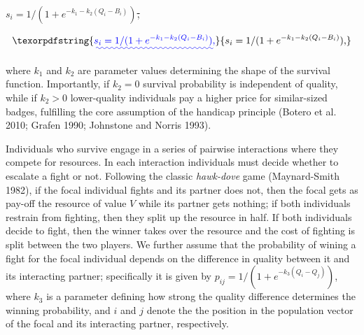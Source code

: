 \documentclass[
  12pt,
]{article}
\providecommand{\DIFaddtex}[1]{{\protect\color{blue}\uwave{#1}}} %
\providecommand{\DIFdeltex}[1]{{\protect\color{red}\sout{#1}}}                      %
\providecommand{\DIFaddbegin}{} %
\providecommand{\DIFaddend}{} %
\providecommand{\DIFdelbegin}{} %
\providecommand{\DIFdelend}{} %
\providecommand{\DIFadd}[1]{\texorpdfstring{\DIFaddtex{#1}}{#1}} %
\providecommand{\DIFdel}[1]{\texorpdfstring{\DIFdeltex{#1}}{}} %
\newcommand{\DIFscaledelfig}{0.5}
\newlength{\DIFdelgraphicswidth} %
\newlength{\DIFdelgraphicsheight} %
\newcommand{\DIFaddincludegraphics}[2][]{{\color{blue}\fbox{\DIFOincludegraphics[#1]{#2}}}} %
\newcommand{\DIFdelincludegraphics}[2][]{%
\sbox{\DIFdelgraphicsbox}{\DIFOincludegraphics[#1]{#2}}%
\settoboxwidth{\DIFdelgraphicswidth}{\DIFdelgraphicsbox} %
\settoboxtotalheight{\DIFdelgraphicsheight}{\DIFdelgraphicsbox} %
\scalebox{\DIFscaledelfig}{%
\parbox[b]{\DIFdelgraphicswidth}{\usebox{\DIFdelgraphicsbox}\\[-\baselineskip] \rule{\DIFdelgraphicswidth}{0em}}\llap{\resizebox{\DIFdelgraphicswidth}{\DIFdelgraphicsheight}{%
\setlength{\unitlength}{\DIFdelgraphicswidth}%
\begin{picture}(1,1)%
\thicklines\linethickness{2pt} %
{\color[rgb]{1,0,0}\put(0,0){\framebox(1,1){}}}%
{\color[rgb]{1,0,0}\put(0,0){\line( 1,1){1}}}%
{\color[rgb]{1,0,0}\put(0,1){\line(1,-1){1}}}%
\end{picture}%
}\hspace*{3pt}}} %
} %
\DeclareRobustCommand{\DIFaddbegin}{\DIFOaddbegin \let\includegraphics\DIFaddincludegraphics} %
\DeclareRobustCommand{\DIFaddend}{\DIFOaddend \let\includegraphics\DIFOincludegraphics} %
\DeclareRobustCommand{\DIFdelbegin}{\DIFOdelbegin \let\includegraphics\DIFdelincludegraphics} %
\DeclareRobustCommand{\DIFdelend}{\DIFOaddend \let\includegraphics\DIFOincludegraphics} %
\begin{document}
\DIFdelbegin \DIFdel{\(s_i=1/(1+e^{-k_1-k_2(Q_i-B_i)})\), }\DIFdelend \DIFaddbegin 

\begin{equation}
\DIFadd{s_i=1/(1+e^{-k_1-k_2(Q_i-B_i)})\textrm{,} \label{eq:viability}
}\end{equation}

\DIFaddend where \(k_1\) and \(k_2\) are parameter values determining the shape of
the survival function. Importantly, if \(k_2=0\) survival probability is
independent of quality, while if \(k_2>0\) lower-quality individuals pay
a higher price for similar-sized badges, fulfilling the core assumption
of the handicap principle (Botero et al. 2010; Grafen 1990; Johnstone
and Norris 1993).

Individuals who survive engage in a series of pairwise interactions
where they compete for resources. In each interaction individuals must
decide whether to escalate a fight or not. Following the classic
\emph{hawk-dove} game (Maynard-Smith 1982), if the focal individual
fights and its partner does not, then the focal gets as pay-off the
resource of value \(V\) while its partner gets nothing; if both
individuals restrain from fighting, then they split up the resource in
half. If both individuals decide to fight, then the winner takes over
the resource and the cost of fighting is split between the two players.
We further assume that the probability of wining a fight for the focal
individual depends on the difference in quality between it and its
interacting partner; specifically it is given by
\(p_{ij}=1/(1+e^{-k_3(Q_i-Q_j)})\), where \(k_3\) is a parameter
defining how strong the quality difference determines the winning
probability, and \(i\) and \(j\) denote the the position in the
population vector of the focal and its interacting partner,
respectively.
\end{document}
